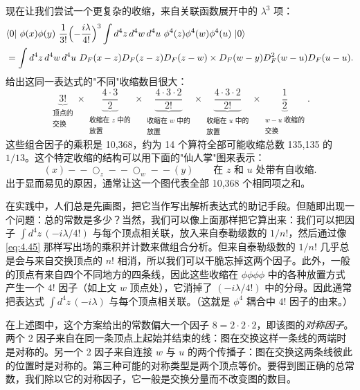 现在让我们尝试一个更复杂的收缩，来自关联函数展开中的 $\lambda^3$ 项：
\begin{equation}
  \begin{aligned}
    &\langle 0|\ \phi(x)\phi(y)\ \frac{1}{3!}\Bigl( -\frac{i\lambda}{4!}
      \Bigr)^3 \int d^4z\,d^4w\,d^4u\ \phi^4(z)\phi^4(w)\phi^4(u)\ |0\rangle\\
    &= \int d^4z\,d^4w\,d^4u\ D_F(x-z)D_F(z-z)D_F(z-w)
      \times D_F(w-y)D_F^2(w-u)D_F(u-u) .
  \end{aligned}
  \label{eq:4.45}
\end{equation}
给出这同一表达式的"不同"收缩数目很大：
\begin{equation}
  \underbrace{3!}_{\substack{\text{顶点的}\\ \text{交换}}}
  \times \underbrace{\frac{4\cdot 3}{2}}_{\substack{\text{收缩在 }z\text{ 中的}\\ \text{放置}}}
  \times \underbrace{\frac{4\cdot 3\cdot 2}{2!}}_{\substack{\text{收缩在 }w\text{ 中的}\\ \text{放置}}}
  \times \underbrace{\frac{4\cdot 3\cdot 2}{2!}}_{\substack{\text{收缩在 }u\text{ 中的}\\ \text{放置}}}
  \times \underbrace{\frac{1}{2}}_{\substack{w-u\text{ 收缩的}\\ \text{交换}}} .
\end{equation}
这些组合因子的乘积是 10,368，约为 14 个算符全部可能收缩总数 135,135 的 $1/13$。这个特定收缩的结构可以用下面的"仙人掌"图来表示：
\begin{equation}
  (x)\!-\!-\!\bigcirc_{z}\!-\!-\!\bigcirc_{w}\!-\!-\!(y)
  \qquad\text{在 } z \text{ 和 } u \text{ 处带有自收缩} .
\end{equation}
出于显而易见的原因，通常让这一个图代表全部 10,368 个相同项之和。

在实践中，人们总是先画图，把它当作写出解析表达式的助记手段。但随即出现一个问题：总的常数是多少？当然，我们可以像上面那样把它算出来：我们可以把因子 $\int d^4z\,(-i\lambda/4!)$ 与每个顶点相关联，放入来自泰勒级数的 $1/n!$，然后通过像 \eqref{eq:4.45} 那样写出场的乘积并计数来做组合分析。但来自泰勒级数的 $1/n!$ 几乎总是会与来自交换顶点的 $n!$ 相消，所以我们可以干脆忘掉这两个因子。此外，一般的顶点有来自四个不同地方的四条线，因此这些收缩在 $\phi\phi\phi\phi$ 中的各种放置方式产生一个 $4!$ 因子（如上文 $w$ 顶点处），它消掉了 $(-i\lambda/4!)$ 中的分母。因此通常把表达式 $\int d^4z\,(-i\lambda)$ 与每个顶点相关联。（这就是 $\phi^4$ 耦合中 $4!$ 因子的由来。）

在上述图中，这个方案给出的常数偏大一个因子 $8 = 2\cdot2\cdot2$，即该图的\emph{对称因子}。两个 2 因子来自在同一条顶点上起始并结束的线：图在交换这样一条线的两端时是对称的。另一个 2 因子来自连接 $w$ 与 $u$ 的两个传播子：图在交换这两条线彼此的位置时是对称的。第三种可能的对称类型是两个顶点等价。要得到图正确的总常数，我们除以它的对称因子，它一般是交换分量而不改变图的数目。

